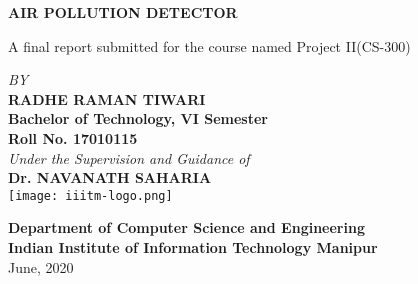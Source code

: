 \thispagestyle{empty}
\begin{center}

\vspace*{1.2 cm}
{\Huge{\bf AIR POLLUTION DETECTOR}}

\vspace{0.3 in}
{\en A final report submitted for the course named Project II(CS-300)}


\vspace{0.5 in}
{\it BY\\}	
\vspace{0.2 in}
{\Large \bf RADHE RAMAN TIWARI\\}
\vspace{0.2 in}
{\bf Bachelor of Technology, VI Semester\\}
\vspace{0.2 in}
{\bf Roll No. 17010115}\\
\vspace{0.5 in}
{\it Under the Supervision and Guidance of\\}
\vspace{0.2 in}
{\Large \bf Dr. NAVANATH SAHARIA}\\

\vspace{0.9 in}
\texttt{[image: iiitm-logo.png]}
\vspace{0.8 in}

{\large\bf Department of Computer Science and Engineering\\}
\vspace{0.2 in}
{\Large\bf Indian Institute of Information Technology Manipur\\}
\vspace{0.1 in}
{\large June, 2020 }

\end{center}

